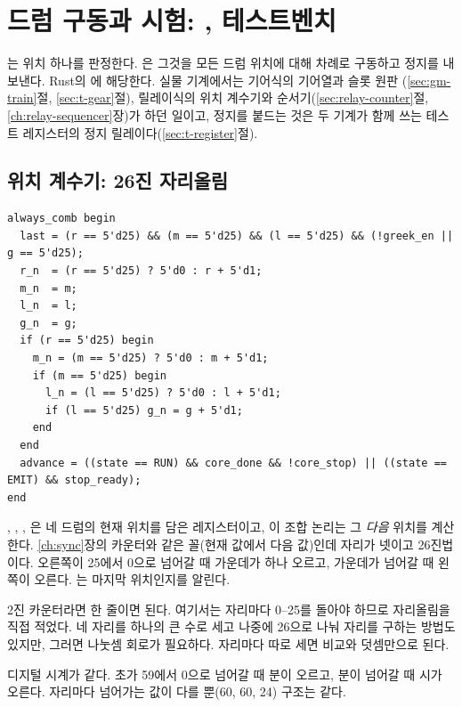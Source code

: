 \chapter{드럼 구동과 시험: \texorpdfstring{}{bombe\_sweep}, 테스트벤치}\label{ch:rtl-sweep}

는 위치 하나를 판정한다. 은 그것을 모든 드럼 위치에 대해 차례로 구동하고
정지를 내보낸다. Rust의 에 해당한다. 실물 기계에서는 기어식의 기어열과 슬롯 원판
(\ref{sec:gm-train}절, \ref{sec:t-gear}절), 릴레이식의 위치 계수기와 순서기(\ref{sec:relay-counter}절,
\ref{ch:relay-sequencer}장)가 하던 일이고, 정지를 붙드는 것은 두 기계가 함께 쓰는 테스트 레지스터의 정지
릴레이다(\ref{sec:t-register}절).

\section{위치 계수기: 26진 자리올림}

\begin{lstlisting}[language=SV,caption={\code{bombe\_sweep.sv}: 다음 드럼 위치.},label={lst:carry}]
always_comb begin
  last = (r == 5'd25) && (m == 5'd25) && (l == 5'd25) && (!greek_en || g == 5'd25);
  r_n  = (r == 5'd25) ? 5'd0 : r + 5'd1;
  m_n  = m;
  l_n  = l;
  g_n  = g;
  if (r == 5'd25) begin
    m_n = (m == 5'd25) ? 5'd0 : m + 5'd1;
    if (m == 5'd25) begin
      l_n = (l == 5'd25) ? 5'd0 : l + 5'd1;
      if (l == 5'd25) g_n = g + 5'd1;
    end
  end
  advance = ((state == RUN) && core_done && !core_stop) || ((state == EMIT) && stop_ready);
end
\end{lstlisting}

, , , 은 네 드럼의 현재 위치를 담은 레지스터이고, 이 조합 논리는 그 \emph{다음}
위치를 계산한다. \ref{ch:sync}장의 카운터와 같은 꼴(현재 값에서 다음 값)인데 자리가 넷이고 26진법이다.
오른쪽이 25에서 0으로 넘어갈 때 가운데가 하나 오르고, 가운데가 넘어갈 때 왼쪽이 오른다. 는 마지막
위치인지를 알린다.

\Why 2진 카운터라면  한 줄이면 된다. 여기서는 자리마다 0--25를 돌아야 하므로 자리올림을
직접 적었다. 네 자리를 하나의 큰 수로 세고 나중에 26으로 나눠 자리를 구하는 방법도 있지만, 그러면 나눗셈
회로가 필요하다. 자리마다 따로 세면 비교와 덧셈만으로 된다.

\General 디지털 시계가 같다. 초가 59에서 0으로 넘어갈 때 분이 오르고, 분이 넘어갈 때 시가 오른다.
자리마다 넘어가는 값이 다를 뿐(60, 60, 24) 구조는 같다.

